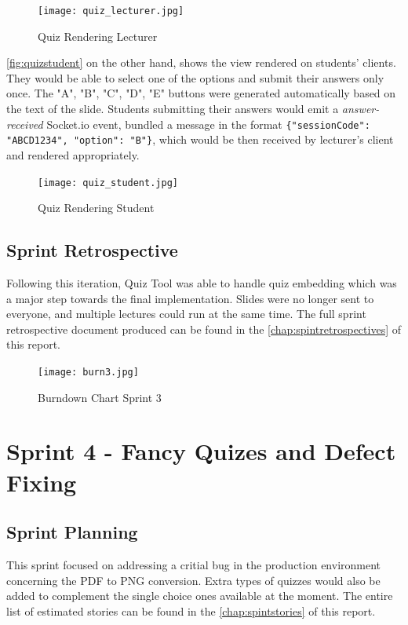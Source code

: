 \begin{figure}[h!]
    \centering
    \texttt{[image: quiz\_lecturer.jpg]}
    \caption{Quiz Rendering Lecturer}
    \label{fig:quizlecturer}
\end{figure}

\autoref{fig:quizstudent} on the other hand, shows the view rendered on students'
clients. They would be able to select one of the options and submit their answers
only once. The "A", "B", "C", "D", "E" buttons were generated automatically based
on the text of the slide. Students submitting their answers would emit a \textit{answer-received}
Socket.io event, bundled a message in the format \texttt{\{"sessionCode": "ABCD1234", "option": "B"\}},
which would be then received by lecturer's client and rendered appropriately.

\begin{figure}[h!]
    \centering
    \texttt{[image: quiz\_student.jpg]}
    \caption{Quiz Rendering Student}
    \label{fig:quizstudent}
\end{figure}

\subsection{Sprint Retrospective}
Following this iteration, Quiz Tool was able to handle quiz embedding which was a major
step towards the final implementation. Slides were no longer sent to everyone,
and multiple lectures could run at the same time.
The full sprint retrospective document produced can be found in the
\autoref{chap:spintretrospectives} of this report.

\begin{figure}[h!]
    \centering
    \texttt{[image: burn3.jpg]}
    \caption{Burndown Chart Sprint 3}
    \label{fig:burn3}
\end{figure}

\newpage
\section{Sprint 4 - Fancy Quizes and Defect Fixing}
\subsection{Sprint Planning}
This sprint focused on addressing a critial bug in the production environment
concerning the PDF to PNG conversion. Extra types of quizzes would also be added
to complement the single choice ones available at the moment. The entire list of estimated stories
can be found in the \autoref{chap:spintstories} of this report.


